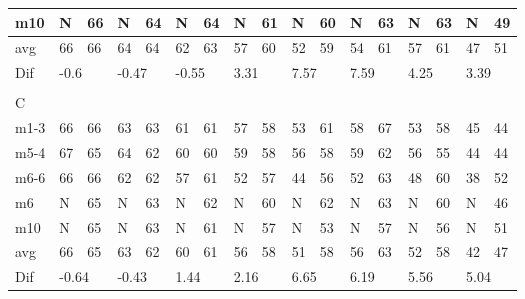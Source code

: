 \begin{table}[H]
\begin{tabular}{l|l|l|l|l|l|l|l|l|l|l|l|l|l|l|ll}
m10  &   N  &     66    &   N    &   64    &     N      &     64      &    N     &     61       &    N     &       60     &      N     &       63     &        N   &       63     & \multicolumn{1}{l|}{N} & 49 \\ \hline
avg       &      66 &   66     &      64    &  64     &    62         &     63       &      57      &   60    &     52       &    59        &    54        &      61      &      57      &     61       & \multicolumn{1}{l|}{47} &51 \\ \hline
Dif & \multicolumn{2}{l|}{-0.6} & \multicolumn{2}{l|}{-0.47} & \multicolumn{2}{l|}{-0.55} & \multicolumn{2}{l|}{3.31} & \multicolumn{2}{l|}{7.57} & \multicolumn{2}{l|}{7.59}& \multicolumn{2}{l|}{4.25}& \multicolumn{2}{l}{3.39} \\
\multicolumn{17}{l}{ } \\   
C & \multicolumn{2}{l|}{} & \multicolumn{2}{l|}{} & \multicolumn{2}{l|}{} & \multicolumn{2}{l|}{} & \multicolumn{2}{l|}{} & \multicolumn{2}{l|}{}& \multicolumn{2}{l|}{}& \multicolumn{2}{l}{}     \\ \hline
m1-3   &   66  &      66      &    63  &   63         &   61   &     61       &  57   &      58      &  53   &  61   &  58   &      67      &   53   &      58      & \multicolumn{1}{l|}{45} &44  \\
m5-4   &    67  &      65      &   64  &     62       &   60    &     60       &  59  &      58      &  56  &  58   &   59  &        62    &   56  &      55      & \multicolumn{1}{l|}{44} &44  \\
m6-6   &    66   &     66       &  62  &     62       &    57   &      61      &  52   &       57     &   44  & 56   &   52   &      63      &   48 &       60     & \multicolumn{1}{l|}{38} & 52 \\
m6   &   N    &     65       &  N  &    63        & N   &      62      &  N   &      60      & N & 62   &   N   &      63      &   N   &    60        & \multicolumn{1}{l|}{N} & 46 \\
m10  &  N   &      65      &   N  &    63        &  N  &      61      &   N  &       57    &  N  &  53 &  N   &     57       &   N  &      56      & \multicolumn{1}{l|}{N} &  51\\ \hline
avg      &   66    &      65      &     63   &     62      &      60&   61      &       56  &     58       &   51   &  58     &  56     &   63         &      52      &    58        & \multicolumn{1}{l|}{42} &47 \\ \hline
Dif & \multicolumn{2}{l|}{-0.64} & \multicolumn{2}{l|}{-0.43} & \multicolumn{2}{l|}{1.44} & \multicolumn{2}{l|}{2.16} & \multicolumn{2}{l|}{6.65} & \multicolumn{2}{l|}{6.19}& \multicolumn{2}{l|}{5.56}& \multicolumn{2}{l}{5.04} \\

\end{tabular}
\end{table}

